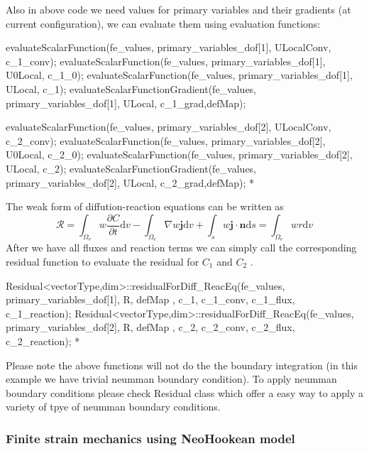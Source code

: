  Also in above code we need values for primary variables and their gradients (at current configuration), we can evaluate them using {\ttfamily evaluation} {\ttfamily functions\-:} 
\begin{DoxyCode}
            evaluateScalarFunction(fe\_values, primary\_variables\_dof[1], ULocalConv, c\_1\_conv);
            evaluateScalarFunction(fe\_values, primary\_variables\_dof[1], U0Local, c\_1\_0);
            evaluateScalarFunction(fe\_values, primary\_variables\_dof[1], ULocal, c\_1);   
            evaluateScalarFunctionGradient(fe\_values, primary\_variables\_dof[1], ULocal, c\_1\_grad,defMap);
            
            evaluateScalarFunction(fe\_values, primary\_variables\_dof[2], ULocalConv, c\_2\_conv);
            evaluateScalarFunction(fe\_values, primary\_variables\_dof[2], U0Local, c\_2\_0);
            evaluateScalarFunction(fe\_values, primary\_variables\_dof[2], ULocal, c\_2);   
            evaluateScalarFunctionGradient(fe\_values, primary\_variables\_dof[2], ULocal, c\_2\_grad,defMap);
*
\end{DoxyCode}
 The weak form of diffution-\/reaction equations can be written as \[ \mathscr{R}=\int_{\Omega_{\text{e}}}w\frac{\partial C}{\partial t}\text{d}v-\int_{\Omega_{\text{e}}} \nabla w \boldsymbol{j} \text{d}v+\int_{s}w\boldsymbol{j}\cdot\boldsymbol{n} \text{d}s=\int_{\Omega_{\text{e}}}w r \text{d}v \] After we have all fluxes and reaction terms we can simply call the corresponding residual function to evaluate the residual for $C_\text{1}$ and $C_\text{2}$ . 
\begin{DoxyCode}
            Residual<vectorType,dim>::residualForDiff_ReacEq(fe\_values, primary\_variables\_dof[1], R, defMap
      , c\_1, c\_1\_conv, c\_1\_flux, c\_1\_reaction);
            Residual<vectorType,dim>::residualForDiff_ReacEq(fe\_values, primary\_variables\_dof[2], R, defMap
      , c\_2, c\_2\_conv, c\_2\_flux, c\_2\_reaction);
*
\end{DoxyCode}
 Please note the above functions will not do the the boundary integration (in this example we have trivial neumman boundary condition). To apply neumman boundary conditions please check {\ttfamily Residual} class which offer a easy way to apply a variety of tpye of neumman boundary conditions. \hypertarget{brain_morph_mechanics}{}\subsubsection{Finite strain mechanics using Neo\-Hookean model}\label{brain_morph_mechanics}
